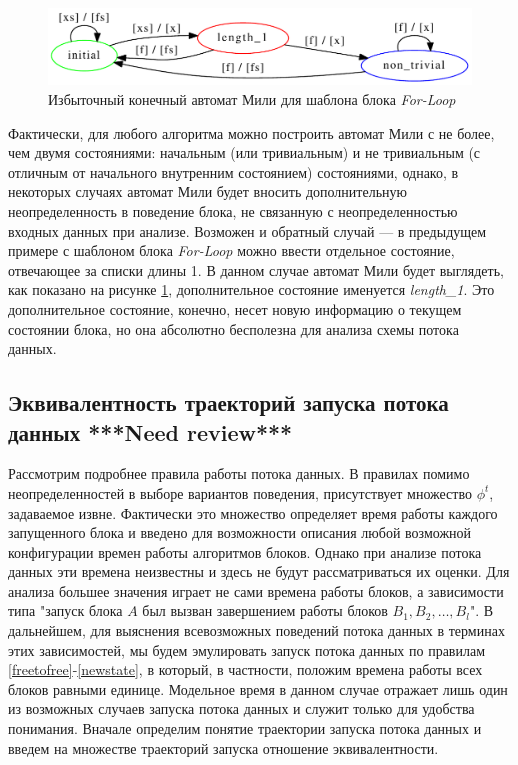 \documentclass[10pt,a4paper]{article}
\begin{document}
\begin{figure}
    \centering
    \includegraphics[width=\textwidth]{map_extra_fa.pdf}
    \caption{Избыточный конечный автомат Мили для шаблона блока \textit{For-Loop}}
    \label{map:extra_fa}
\end{figure}

Фактически, для любого алгоритма можно построить автомат Мили с не более, чем двумя состояниями: начальным (или тривиальным) и не тривиальным (с отличным от начального внутренним
состоянием) состояниями, однако, в некоторых случаях автомат Мили будет вносить дополнительную неопределенность в поведение блока, не связанную с неопределенностью
входных данных при анализе. Возможен и обратный случай --- в предыдущем примере с шаблоном блока \textit{For-Loop} можно ввести отдельное состояние, отвечающее за списки длины 1.
В данном случае автомат Мили будет выглядеть, как показано на рисунке \ref{map:extra_fa}, дополнительное состояние именуется \textit{length\_1}. Это дополнительное состояние, конечно,
несет новую информацию о текущем состоянии блока, но она абсолютно бесполезна для анализа схемы потока данных.

\subsection{Эквивалентность траекторий запуска потока данных \textbf{***Need review***}}
  Рассмотрим подробнее правила работы потока данных. В правилах помимо неопределенностей в выборе вариантов поведения, присутствует множество $\phi^t$, задаваемое извне.
  Фактически это множество определяет время работы каждого запущенного блока и введено для возможности описания любой возможной конфигурации времен работы алгоритмов блоков.
  Однако при анализе потока данных эти времена неизвестны и здесь не будут рассматриваться их оценки. Для анализа большее значения играет не сами времена работы блоков, а
  зависимости типа "запуск блока $A$ был вызван завершением работы блоков $B_1, B_2, \dots, B_l$".
  В дальнейшем, для выяснения всевозможных поведений потока данных в терминах этих зависимостей,
  мы будем эмулировать запуск потока данных по правилам \eqref{freetofree}-\eqref{newstate}, в который, в частности, положим времена работы всех блоков равными единице.
  Модельное время в данном случае отражает лишь один из возможных случаев запуска потока данных и служит только для удобства понимания.
  Вначале определим понятие траектории запуска потока данных и введем на множестве траекторий запуска отношение эквивалентности.
  
\end{document}

